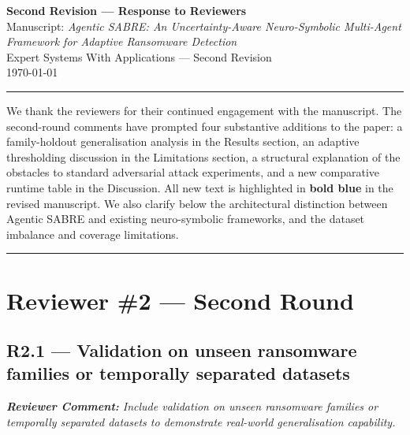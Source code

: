\documentclass[11pt,a4paper]{article}
\newcommand{\RC}[1]{\begin{reviewbox}\textit{\textbf{Reviewer Comment:} #1}\end{reviewbox}}
\begin{document}
\begin{center}
  {\LARGE\bfseries Second Revision --- Response to Reviewers}\\[1em]
  {\large Manuscript: \textit{Agentic SABRE: An Uncertainty-Aware Neuro-Symbolic
  Multi-Agent Framework for Adaptive Ransomware Detection}}\\[0.5em]
  {\normalsize Expert Systems With Applications --- Second Revision}\\[0.5em]
  {\normalsize \today}
\end{center}

\hrule
\bigskip

We thank the reviewers for their continued engagement with the manuscript. The
second-round comments have prompted four substantive additions to the paper: a
family-holdout generalisation analysis in the Results section, an adaptive
thresholding discussion in the Limitations section, a structural explanation of
the obstacles to standard adversarial attack experiments, and a new comparative
runtime table in the Discussion. All new text is highlighted in \textbf{bold blue}
in the revised manuscript. We also clarify below the architectural distinction
between Agentic SABRE and existing neuro-symbolic frameworks, and the dataset
imbalance and coverage limitations.

\bigskip
\hrule
\bigskip

\section{Reviewer \#2 --- Second Round}

\subsection*{R2.1 --- Validation on unseen ransomware families or temporally separated datasets}

\RC{Include validation on unseen ransomware families or temporally separated datasets
to demonstrate real-world generalisation capability.}
\end{document}
